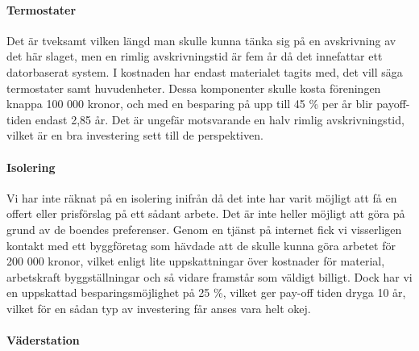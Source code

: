 \paragraph{Termostater}
Det är tveksamt vilken längd man skulle kunna tänka sig på en avskrivning av det här slaget, men en  rimlig avskrivningstid är fem år då det innefattar ett datorbaserat system. I kostnaden har endast materialet tagits med, det vill säga termostater samt huvudenheter. Dessa komponenter skulle kosta föreningen knappa 100 000 kronor, och med en besparing på upp till 45 \% per år blir payoff-tiden endast 2,85 år. Det är ungefär motsvarande en halv rimlig avskrivningstid, vilket är en bra investering sett till de perspektiven.

\paragraph{Isolering}
Vi har inte räknat på en isolering inifrån då det inte har varit möjligt att få en offert eller prisförslag på ett sådant arbete. Det är inte heller möjligt att göra på grund av de boendes preferenser. Genom en tjänst på internet fick vi visserligen kontakt med ett byggföretag som hävdade att de skulle kunna göra arbetet för 200 000 kronor, vilket enligt lite uppskattningar över kostnader för material, arbetskraft byggställningar och så vidare framstår som väldigt billigt. Dock har vi en uppskattad besparingsmöjlighet på 25 \%, vilket ger pay-off tiden dryga 10 år, vilket för en sådan typ av investering får anses vara helt okej.

\paragraph{Väderstation}

